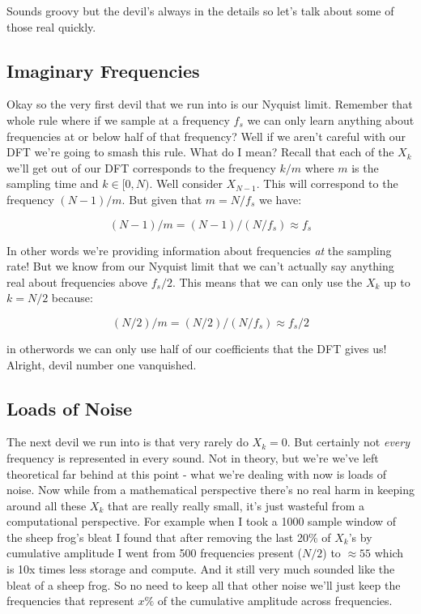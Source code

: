 \documentclass[10pt,a5paper]{book}
\begin{document}
Sounds groovy but the devil's always in the details so let's talk about some of those real quickly.  

\subsection{Imaginary Frequencies}
Okay so the very first devil that we run into is our Nyquist limit. Remember that whole rule where if we sample at a frequency $f_s$ we can only learn anything about frequencies at or below half of that frequency? Well if we aren't careful with our DFT we're going to smash this rule. What do I mean? Recall that each of the $X_k$ we'll get out of our DFT corresponds to the frequency $k/m$ where $m$ is the sampling time and $k\in [0, N)$. Well consider $X_{N-1}$. This will correspond to the frequency $(N-1)/m$. But given that $m=N / f_s$ we have:

\begin{equation}
(N-1)/m=(N-1)/(N / f_s) \approx f_s
\end{equation}

In other words we're providing information about frequencies \textit{at} the sampling rate! But we know from our Nyquist limit that we can't actually say anything real about frequencies above $f_s/2$. This means that we can only use the $X_k$ up to $k=N/2$ because:

\begin{equation}
(N/2)/m=(N/2)/(N /f_s) \approx f_s/2
\end{equation}

in otherwords we can only use half of our coefficients that the DFT gives us! Alright, devil number one vanquished. 

\subsection{Loads of Noise}
The next devil we run into is that very rarely do $X_k=0$. But certainly not \textit{every} frequency is represented in every sound. Not in theory, but we're we've left theoretical far behind at this point - what we're dealing with now is loads of noise. Now while from a mathematical perspective there's no real harm in keeping around all these $X_k$ that are really really small, it's just wasteful from a computational perspective. For example when I took a 1000 sample window of the sheep frog's bleat I found that after removing the last 20\% of $X_k$'s by cumulative amplitude I went from 500 frequencies present ($N/2$) to $\approx 55$ which is 10x times less storage and compute. And it still very much sounded like the bleat of a sheep frog. So no need to keep all that other noise we'll just keep the frequencies that represent $x\%$ of the cumulative amplitude across frequencies. 
\end{document}
